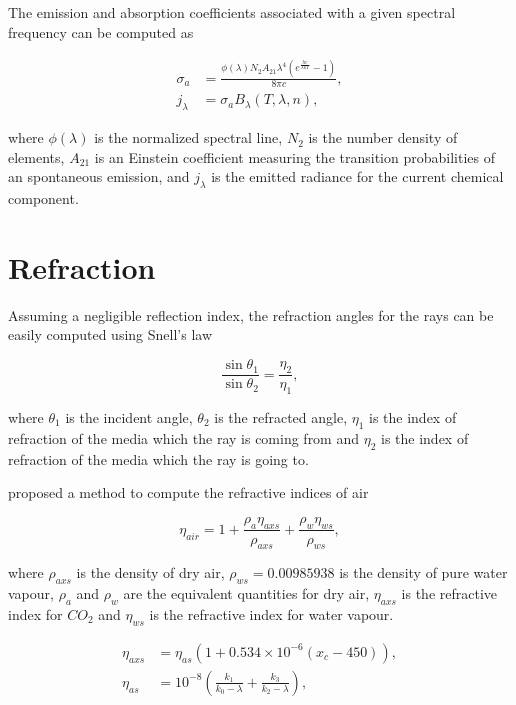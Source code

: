 The emission and absorption coefficients associated with a given spectral frequency can be computed as


\begin{align}
\sigma_a &= \frac{\phi(\lambda) N_2 A_{21} \lambda^4 (e ^\frac{h c}{\lambda k T} - 1)}{8 \pi c}, \\
j_\lambda &= \sigma_a B_\lambda (T, \lambda, n), 
\end{align}

where $\phi(\lambda)$ is the normalized spectral line, $N_2$ is the number density of elements, $A_{21}$ is an Einstein coefficient measuring the transition probabilities of an spontaneous emission, and $j_\lambda$ is the emitted radiance for the current chemical component.

\section{Refraction}
\label{sec:refraction}

Assuming a negligible reflection index, the refraction angles for the rays can be easily computed using Snell's law

\begin{equation}
\frac{\sin \theta_1}{\sin \theta_2} = \frac{\eta_2}{\eta_1},
\end{equation}

where $\theta_1$ is the incident angle, $\theta_2$ is the refracted angle, $\eta_1$ is the index of refraction of the media which the ray is coming from and $\eta_2$ is the index of refraction of the media which the ray is going to.

\cite{Ciddor:1996} proposed a method to compute the refractive indices of air 

\begin{equation}
\label{eq:ciddor_eta_air}
\eta_{air} = 1 + \frac{\rho_a \eta_{axs}}{\rho_{axs}} + \frac{\rho_w \eta_{ws}}{\rho_{ws}},
\end{equation}

where $\rho_{axs}$ is the density of dry air, $\rho_{ws} = 0.00985938$ is the density of pure water vapour, $\rho_{a}$ and $\rho_{w}$ are the equivalent quantities for dry air, $\eta_{axs}$ is the refractive index for $CO_2$ and $\eta_{ws}$ is the refractive index for water vapour. 

\begin{align}
\label{eq:ciddor_eta_axs}
\eta_{axs} &= \eta_{as} \left(1 + 0.534 \times 10^{-6} \left(x_c - 450 \right) \right), \\
\label{eq:ciddor_eta_as}
\eta_{as} &= 10^{-8} \left( \frac{k_1}{k_0 - \lambda} + \frac{k_3}{k_2 - \lambda} \right),
\end{align}

